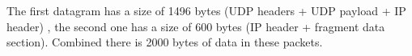 The first datagram has a size of 1496 bytes (UDP headers + UDP payload + IP header) , the second one has a size of 600 bytes (IP header + fragment data section). Combined there is 2000 bytes of data in these packets.